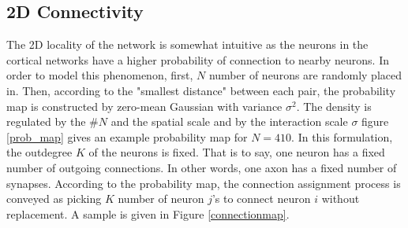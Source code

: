 \documentclass[a4paper,12pt]{article}
\begin{document}
\subsection{2D Connectivity}
The 2D locality of the network is somewhat intuitive as the neurons in the cortical networks have a higher probability of connection to nearby neurons. In order to model this phenomenon, first, $N$ number of neurons are randomly placed in. Then, according to the "smallest distance" between each pair, the probability map is constructed by zero-mean Gaussian with variance $\sigma^2$. The density is regulated by the $\#N$ and the spatial scale and by the interaction scale $\sigma$ figure \ref{prob_map} gives an example probability map for $N = 410$. In this formulation, the outdegree $K$ of the neurons is fixed. That is to say, one neuron has a fixed number of outgoing connections. In other words, one axon has a fixed number of synapses. According to the probability map, the connection assignment process is conveyed as picking $K$ number of neuron $j$'s to connect neuron $i$ without replacement. A sample is given in Figure \ref{connectionmap}.
\end{document}
